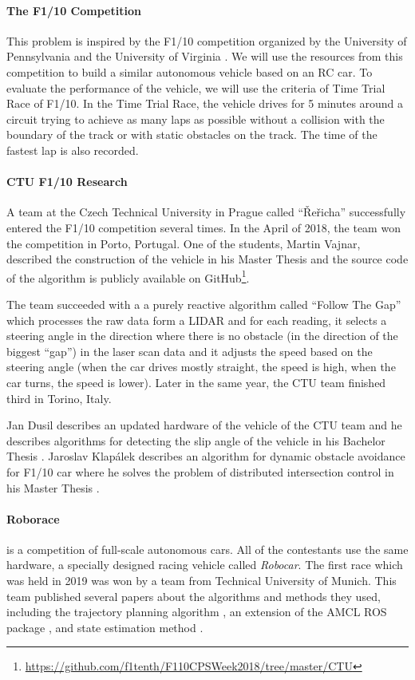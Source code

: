 \paragraph{The F1/10 Competition}

This problem is inspired by the F1/10 competition organized by the University of Pennsylvania and the University of Virginia \cite{F1/10_web}. We will use the resources from this competition to build a similar autonomous vehicle based on an RC car. To evaluate the performance of the vehicle, we will use the criteria of Time Trial Race of F1/10. In the Time Trial Race, the vehicle drives for 5 minutes around a circuit trying to achieve as many laps as possible without a collision with the boundary of the track or with static obstacles on the track. The time of the fastest lap is also recorded.

\paragraph{CTU F1/10 Research} A team at the Czech Technical University in Prague called ``Řeřicha'' successfully entered the F1/10 competition several times. In the April of 2018, the team won the competition in Porto, Portugal. One of the students, Martin Vajnar, described the construction of the vehicle in his Master Thesis \cite{ctu_martin_vajnar} and the source code of the algorithm is publicly available on GitHub\footnote{\url{https://github.com/f1tenth/F110CPSWeek2018/tree/master/CTU}}.

The team succeeded with a a purely reactive algorithm called ``Follow The Gap'' which processes the raw data form a LIDAR and for each reading, it selects a steering angle in the direction where there is no obstacle (in the direction of the biggest ``gap'') in the laser scan data and it adjusts the speed based on the steering angle (when the car drives mostly straight, the speed is high, when the car turns, the speed is lower). Later in the same year, the CTU team finished third in Torino, Italy.

Jan Dusil describes an updated hardware of the vehicle of the CTU team and he describes algorithms for detecting the slip angle of the vehicle in his Bachelor Thesis \cite{ctu_jan_dusil}. Jaroslav Klapálek describes an algorithm for dynamic obstacle avoidance for F1/10 car where he solves the problem of distributed intersection control in his Master Thesis \cite{ctu_jaroslav_klapalek}.

\paragraph{Roborace} is a competition of full-scale autonomous cars. All of the contestants use the same hardware, a specially designed racing vehicle called \textit{Robocar}. The first race which was held in 2019 was won by a team from Technical University of Munich. This team published several papers about the algorithms and methods they used, including the trajectory planning algorithm \cite{tum_roborace_planning}, an extension of the AMCL ROS package \cite{tum_roborace_ros}, and state estimation method \cite{tum_roborace_state_estimation}.